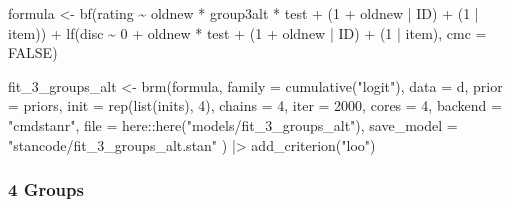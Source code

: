 \documentclass[
  man,floatsintext]{apa7}
\newenvironment{Shaded}{\begin{snugshade}}{\end{snugshade}}
\newcommand{\AttributeTok}[1]{\textcolor[rgb]{0.77,0.63,0.00}{#1}}
\newcommand{\ConstantTok}[1]{\textcolor[rgb]{0.00,0.00,0.00}{#1}}
\newcommand{\DecValTok}[1]{\textcolor[rgb]{0.00,0.00,0.81}{#1}}
\newcommand{\FunctionTok}[1]{\textcolor[rgb]{0.00,0.00,0.00}{#1}}
\newcommand{\NormalTok}[1]{#1}
\newcommand{\OtherTok}[1]{\textcolor[rgb]{0.56,0.35,0.01}{#1}}
\newcommand{\SpecialCharTok}[1]{\textcolor[rgb]{0.00,0.00,0.00}{#1}}
\newcommand{\StringTok}[1]{\textcolor[rgb]{0.31,0.60,0.02}{#1}}
\begin{document}
\begin{Shaded}
\begin{Highlighting}[]
\NormalTok{formula }\OtherTok{\textless{}{-}} \FunctionTok{bf}\NormalTok{(rating }\SpecialCharTok{\textasciitilde{}}\NormalTok{ oldnew }\SpecialCharTok{*}\NormalTok{ group3alt }\SpecialCharTok{*}\NormalTok{ test }\SpecialCharTok{+}
\NormalTok{  (}\DecValTok{1} \SpecialCharTok{+}\NormalTok{ oldnew }\SpecialCharTok{|}\NormalTok{ ID) }\SpecialCharTok{+}\NormalTok{ (}\DecValTok{1} \SpecialCharTok{|}\NormalTok{ item)) }\SpecialCharTok{+}
  \FunctionTok{lf}\NormalTok{(disc }\SpecialCharTok{\textasciitilde{}} \DecValTok{0} \SpecialCharTok{+}\NormalTok{ oldnew }\SpecialCharTok{*}\NormalTok{ test }\SpecialCharTok{+}
\NormalTok{    (}\DecValTok{1} \SpecialCharTok{+}\NormalTok{ oldnew }\SpecialCharTok{|}\NormalTok{ ID) }\SpecialCharTok{+}\NormalTok{ (}\DecValTok{1} \SpecialCharTok{|}\NormalTok{ item), }\AttributeTok{cmc =} \ConstantTok{FALSE}\NormalTok{)}


\NormalTok{fit\_3\_groups\_alt }\OtherTok{\textless{}{-}} \FunctionTok{brm}\NormalTok{(formula,}
  \AttributeTok{family =} \FunctionTok{cumulative}\NormalTok{(}\StringTok{"logit"}\NormalTok{),}
  \AttributeTok{data =}\NormalTok{ d,}
  \AttributeTok{prior =}\NormalTok{ priors,}
  \AttributeTok{init =} \FunctionTok{rep}\NormalTok{(}\FunctionTok{list}\NormalTok{(inits), }\DecValTok{4}\NormalTok{),}
  \AttributeTok{chains =} \DecValTok{4}\NormalTok{, }\AttributeTok{iter =} \DecValTok{2000}\NormalTok{, }\AttributeTok{cores =} \DecValTok{4}\NormalTok{,}
  \AttributeTok{backend =} \StringTok{"cmdstanr"}\NormalTok{,}
  \AttributeTok{file =}\NormalTok{ here}\SpecialCharTok{::}\FunctionTok{here}\NormalTok{(}\StringTok{"models/fit\_3\_groups\_alt"}\NormalTok{),}
  \AttributeTok{save\_model =} \StringTok{"stancode/fit\_3\_groups\_alt.stan"}
\NormalTok{) }\SpecialCharTok{|\textgreater{}}
  \FunctionTok{add\_criterion}\NormalTok{(}\StringTok{"loo"}\NormalTok{)}
\end{Highlighting}
\end{Shaded}

\hypertarget{groups-5}{%
\subsubsection{4 Groups}\label{groups-5}}
\end{document}
